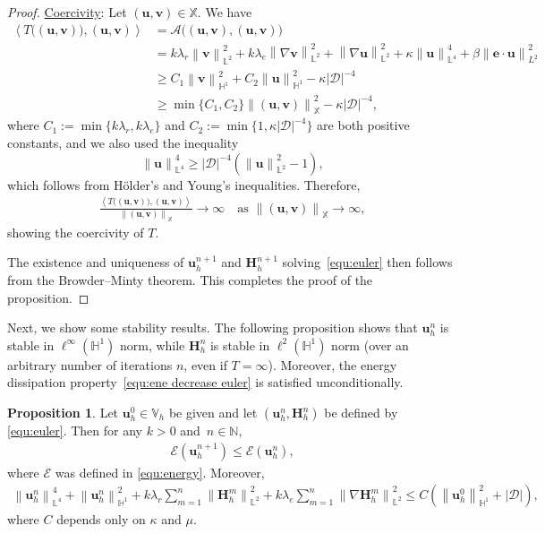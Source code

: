 \documentclass[11pt, reqno]{amsart}
\theoremstyle{definition}
\newtheorem{proposition}[theorem]{Proposition}
\theoremstyle{remark}
\numberwithin{equation}{section}
\newcommand{\bff}{\boldsymbol}
\newcommand{\bb}{\mathbb}
\newcommand{\norm}[2]{\left\|{#1}\right\|_{#2}}
\newcommand{\inpro}[2]{\left\langle#1,#2\right\rangle}
\newcommand{\abs}[1]{\left|{#1}\right|}
\begin{document}
\begin{proof}
\medskip
\noindent
\underline{Coercivity}: Let $(\bff{u},\bff{v})\in \bb{X}$. We have
\begin{align*}
	\inpro{T\big((\bff{u},\bff{v})\big)}{(\bff{u},\bff{v})}
	&=
	\mathcal{A}\big((\bff{u},\bff{v}), (\bff{u},\bff{v})\big) 
	\\
	&=
	k\lambda_r \norm{\bff{v}}{\bb{L}^2}^2
	+
	k\lambda_e \norm{\nabla \bff{v}}{\bb{L}^2}^2
	+
	\norm{\nabla \bff{u}}{\bb{L}^2}^2
	+
	\kappa \norm{\bff{u}}{\bb{L}^4}^4
	+
	\beta \norm{\bff{e}\cdot\bff{u}}{L^2}^2
	\\
	&\geq
	C_1 \norm{\bff{v}}{\bb{H}^1}^2
	+
	C_2 \norm{\bff{u}}{\bb{H}^1}^2
	-
	\kappa \abs{\mathscr{D}}^{-4}
	\\
	&\geq
	\min\{C_1,C_2\} \norm{(\bff{u},\bff{v})}{\bb{X}}^2 - \kappa\abs{\mathscr{D}}^{-4},
\end{align*}
where $C_1:=\min\{k\lambda_r,k\lambda_e\}$ and $C_2:= \min\{1,\kappa\abs{\mathscr{D}}^{-4}\}$ are both positive constants, and we also used the inequality
\[
\norm{\bff{u}}{\bb{L}^4}^4 \geq \abs{\mathscr{D}}^{-4} \left(\norm{\bff{u}}{\bb{L}^2}^2-1\right),
\]
which follows from H\"older's and Young's inequalities. Therefore,
\begin{align*} 			
	\frac{\inpro{T\big((\bff{u},\bff{v})\big)}{(\bff{u},\bff{v})}}{\norm{(\bff{u},\bff{v})}{\bb{X}}}
	\to \infty
	\quad \text{as } \norm{(\bff{u},\bff{v})}{\bb{X}}\to \infty,
\end{align*}
showing the coercivity of $T$.

\medskip
\noindent
The existence and uniqueness of  $\bff{u}_h^{n+1}$ and $\bff{H}_h^{n+1}$ solving~\eqref{equ:euler} then follows from the Browder--Minty theorem. This completes the proof of the proposition.
\end{proof}

Next, we show some stability results. The following proposition shows that $\bff{u}_h^n$ is stable in $\ell^\infty(\bb{H}^1)$ norm, while $\bff{H}_h^n$ is stable in $\ell^2(\bb{H}^1)$ norm (over an arbitrary number of iterations $n$, even if $T=\infty$). Moreover, the energy dissipation property~\eqref{equ:ene decrease euler} is satisfied unconditionally.

\begin{proposition}\label{pro:ene dec H1 euler}
	Let $\bff{u}_h^0 \in \bb{V}_h$ be given and let $\left(\bff{u}_h^n, \bff{H}_h^n\right)$ be defined by
	\eqref{equ:euler}. Then for any $k>0$ and~$n\in \bb{N}$,
	\begin{align}\label{equ:ene decrease euler}
		\mathcal{E}(\bff{u}_h^{n+1}) \leq \mathcal{E}(\bff{u}_h^n),
	\end{align}
	where $\mathcal{E}$ was defined in \eqref{equ:energy}. Moreover,
	\begin{align}\label{equ:stab L4 H1 euler}
		\norm{\bff{u}_h^n}{\bb{L}^4}^4
		+
		\norm{\bff{u}_h^n}{\bb{H}^1}^2
		+
		k\lambda_r \sum_{m=1}^n \norm{\bff{H}_h^{m}}{\bb{L}^2}^2
		+
		k\lambda_e \sum_{m=1}^n \norm{\nabla \bff{H}_h^{m}}{\bb{L}^2}^2
		\leq
		C \left( \norm{\bff{u}_h^0}{\bb{H}^1}^2 + |\mathscr{D}| \right),
	\end{align}
	where $C$ depends only on $\kappa$ and $\mu$.
\end{proposition}
\end{document}
